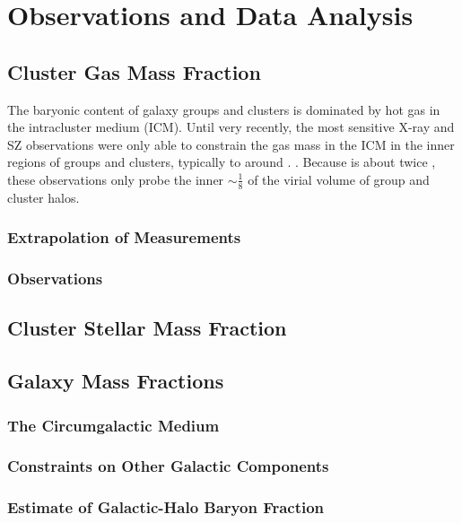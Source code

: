 \chapter{Observations and Data Analysis}
\label{c.Data}
\section{Cluster Gas Mass Fraction}
\label{s.Gas}
The baryonic content of galaxy groups and clusters is dominated by hot gas in the
intracluster medium (ICM). Until very recently, the most sensitive
X-ray and SZ observations were only able to constrain the gas mass in
the ICM in the inner regions of groups and clusters, typically to
around \rfive. .  Because \rfive{} is about twice \rvir{}, these observations
only probe the inner $\sim \frac{1}{8}$ of the virial volume of group
and cluster halos.

\subsection{Extrapolation of Measurements}
\label{s.Gas.Extrapolation}

\subsection{Observations}
\label{s.Gas.Observations}

\section{Cluster Stellar Mass Fraction}
\label{s.Stellar}

\section{Galaxy Mass Fractions}
\label{s.Galaxy}

\subsection{The Circumgalactic Medium}
\label{s.Galaxy.CGM}

\subsection{Constraints on Other Galactic Components}
\label{s.Galaxy.Components}

\subsection{Estimate of Galactic-Halo Baryon Fraction}
\label{s.Galaxy.Fraction}
